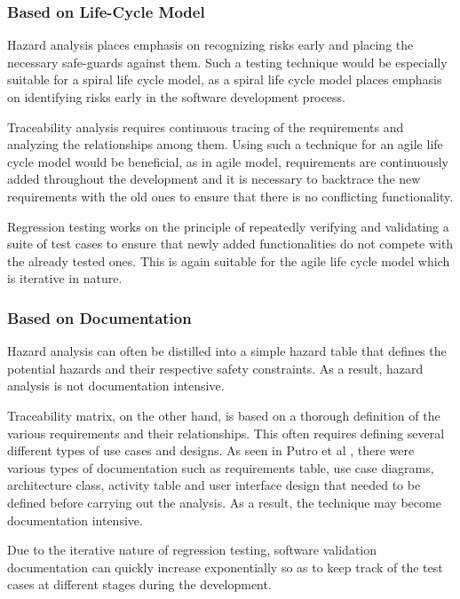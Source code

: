 \documentclass[journal, onecolumn]{IEEEtran}
\begin{document}
	\bigskip
	
	\subsubsection{Based on Life-Cycle Model}
	
	Hazard analysis places emphasis on recognizing risks early and placing the necessary safe-guards against them. Such a testing technique would be especially suitable for a spiral life cycle model, as a spiral life cycle model places emphasis on identifying risks early in the software development process. 
	
	Traceability analysis requires continuous tracing of the requirements and analyzing the relationships among them. Using such a technique for an agile life cycle model would be beneficial, as in agile model, requirements are continuously added throughout the development and it is necessary to backtrace the new requirements with the old ones to ensure that there is no conflicting functionality.
	
	Regression testing works on the principle of repeatedly verifying and validating a suite of test cases to ensure that newly added functionalities do not compete with the already tested ones. This is again suitable for the agile life cycle model which is iterative in nature.
	
	\bigskip
	
	\subsubsection{Based on Documentation}
	
	Hazard analysis can often be distilled into a simple hazard table that defines the potential hazards and their respective safety constraints. As a result, hazard analysis is not documentation intensive.
	
	Traceability matrix, on the other hand, is based on a thorough definition of the various requirements and their relationships. This often requires defining several different types of use cases and designs. As seen in Putro et al \cite{trace}, there were various types of documentation such as requirements table, use case diagrams, architecture class, activity table and user interface design that needed to be defined before carrying out the analysis. As a result, the technique may become documentation intensive.
	
	Due to the iterative nature of regression testing, software validation documentation can quickly increase exponentially so as to keep track of the test cases at different stages during the development.
	
\end{document}
